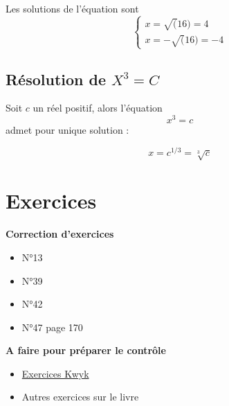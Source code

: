 \documentclass[a4paper,12pt]{article}
\begin{document}
Les solutions de l'équation sont 
\[
  \begin{cases}
    x = \sqrt(16) = 4 \\
    x = - \sqrt(16) = - 4
  \end{cases}
\]

\subsection*{Résolution de \(X^3 = C\)}

Soit $c$ un réel positif, alors l'équation 
\[
  x^3 = c
\]
admet pour unique solution : 

\[
  x = c^{1/3} = \sqrt[3]{c}
\]

\section*{Exercices}

\begin{tcolorbox}[colback=blue!10!white, colframe=blue!75!black, title=Exemples - Application]
  \textbf{Correction d'exercices}
  
  \begin{itemize}[noitemsep]
    \item N°13
    \item N°39
    \item N°42
    \item N°47 page 170
  \end{itemize}

  \textbf{A faire pour préparer le contrôle}
  \begin{itemize}[noitemsep]
    \item \href{https://www.kwyk.fr/devoirs-prof/#tab=.planned-homeworks;classe=77251}{Exercices Kwyk}
    \item Autres exercices sur le livre
  \end{itemize}
\end{tcolorbox}
\end{document}
